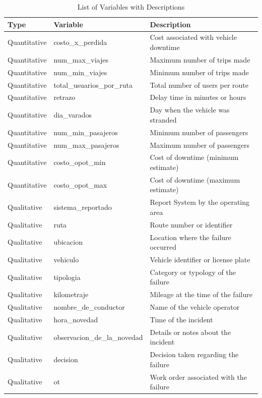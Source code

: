 \documentclass[
  letterpaper,
  DIV=11,
  numbers=noendperiod]{scrartcl}
\begin{document}
\begin{table}[H]
\centering
\caption{List of Variables with Descriptions}
\centering
\begin{tabular}[t]{l|l|l}
\hline
Type & Variable & Description\\
\hline
Quantitative & costo\_x\_perdida & Cost associated with vehicle downtime\\
\hline
Quantitative & num\_max\_viajes & Maximum number of trips made\\
\hline
Quantitative & num\_min\_viajes & Minimum number of trips made\\
\hline
Quantitative & total\_usuarios\_por\_ruta & Total number of users per route\\
\hline
Quantitative & retrazo & Delay time in minutes or hours\\
\hline
Quantitative & dia\_varados & Day when the vehicle was stranded\\
\hline
Quantitative & num\_min\_pasajeros & Minimum number of passengers\\
\hline
Quantitative & num\_max\_pasajeros & Maximum number of passengers\\
\hline
Quantitative & costo\_opot\_min & Cost of downtime (minimum estimate)\\
\hline
Quantitative & costo\_opot\_max & Cost of downtime (maximum estimate)\\
\hline
Qualitative & sistema\_reportado & Report System by the operating area\\
\hline
Qualitative & ruta & Route number or identifier\\
\hline
Qualitative & ubicacion & Location where the failure occurred\\
\hline
Qualitative & vehiculo & Vehicle identifier or license plate\\
\hline
Qualitative & tipologia & Category or typology of the failure\\
\hline
Qualitative & kilometraje & Mileage at the time of the failure\\
\hline
Qualitative & nombre\_de\_conductor & Name of the vehicle operator\\
\hline
Qualitative & hora\_novedad & Time of the incident\\
\hline
Qualitative & observacion\_de\_la\_novedad & Details or notes about the incident\\
\hline
Qualitative & decision & Decision taken regarding the failure\\
\hline
Qualitative & ot & Work order associated with the failure\\

\end{tabular}
\end{table}
\end{document}
